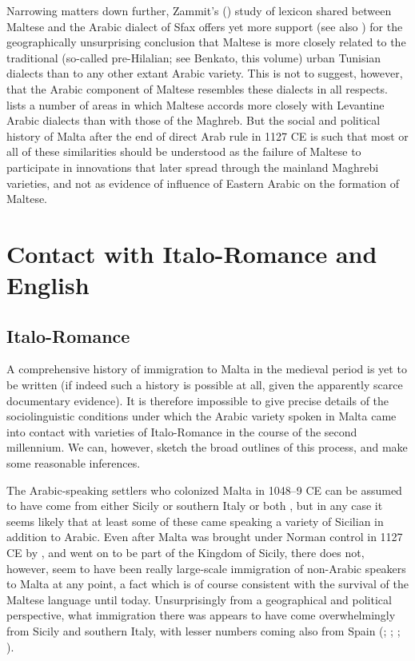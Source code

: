 \documentclass[output=paper]{langsci/langscibook}
\begin{document}
Narrowing matters down further, Zammit's (\citeyear{zammit2014}) study of lexicon shared between Maltese and the Arabic dialect of Sfax offers yet more support (see also \citealt{Vanhove1998}) for the geographically unsurprising conclusion that Maltese is more closely related to the traditional (so-called pre-Hilalian; see Benkato, this volume) urban Tunisian dialects than to any other extant Arabic variety. This is not to suggest, however, that the Arabic component of Maltese resembles these dialects in all respects. \cite{Borg1996} lists a number of areas in which Maltese accords more closely with Levantine Arabic dialects than with those of the Maghreb. But the social and political history of Malta after the end of direct Arab rule in 1127 CE is such that most or all of these similarities should be understood as the failure of Maltese to participate in innovations that later spread through the mainland Maghrebi varieties, and not as evidence of influence of Eastern Arabic on the formation of Maltese.

\section{Contact with Italo-Romance and English} 
\subsection{Italo-Romance}
A comprehensive history of immigration to Malta in the medieval period is yet to be written (if indeed such a history is possible at all, given the apparently scarce documentary evidence). It is therefore impossible to give precise details of the sociolinguistic conditions under which the Arabic variety spoken in Malta came into contact with varieties of Italo-Romance in the course of the second millennium. We can, however, sketch the broad outlines of this process, and make some reasonable inferences. 

The Arabic-speaking settlers who colonized Malta in 1048--9 CE can be assumed to have come from either Sicily or southern Italy or both \citep[22]{brincat1995}, but in any case it seems likely that at least some of these came speaking a variety of Sicilian in addition to Arabic. Even after Malta was brought under Norman control in 1127 CE by , and went on to be part of the Kingdom of Sicily, there does not, however, seem to have been really large-scale immigration of non-Arabic speakers to Malta at any point, a fact which is of course consistent with the survival of the Maltese language until today. Unsurprisingly from a geographical and political perspective, what immigration there was appears to have come overwhelmingly from Sicily and southern Italy, with lesser numbers coming also from Spain (\citealt[134, 289]{ballou1893}; \citealt[43--46]{blouet1967}; \citealt{fiorini1986}; \citealt[26--32]{goodwin2002}). 
\end{document}
